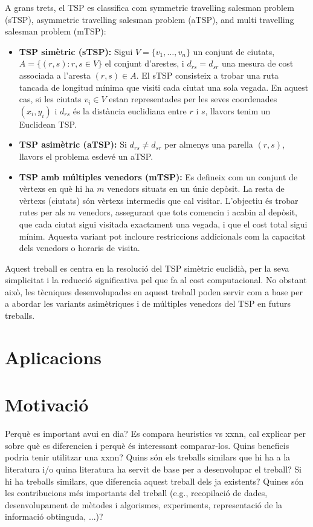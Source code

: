 \documentclass[a4paper,12pt,twoside]{ThesisStyle}
\begin{document}
\medskip

A grans trets, el TSP es classifica com symmetric travelling salesman problem (sTSP), asymmetric travelling salesman problem (aTSP), and multi travelling salesman problem (mTSP):
\begin{itemize}
  \item \textbf{TSP simètric (sTSP):} Sigui \( V = \{ v_1, \dots, v_n \} \) un conjunt de ciutats, \( A = \{ (r,s) : r,s \in V \} \) el conjunt d'arestes, i \( d_{rs} = d_{sr} \) una mesura de cost associada a l'aresta \( (r,s) \in A \). El sTSP consisteix a trobar una ruta tancada de longitud mínima que visiti cada ciutat una sola vegada. En aquest cas, si les ciutats \( v_i \in V \) estan representades per les seves coordenades \( (x_i, y_i) \) i \( d_{rs} \) és la distància euclidiana entre \( r \) i \( s \), llavors tenim un Euclidean TSP.
  \item \textbf{TSP asimètric (aTSP):} Si \( d_{rs} \neq d_{sr} \) per almenys una parella \( (r,s) \), llavors el problema esdevé un aTSP.
  \item \textbf{TSP amb múltiples venedors (mTSP):} Es defineix com un conjunt de vèrtexs en què hi ha \( m \) venedors situats en un únic depòsit. La resta de vèrtexs (ciutats) són vèrtexs intermedis que cal visitar. L'objectiu és trobar rutes per als \( m \) venedors, assegurant que tots comencin i acabin al depòsit, que cada ciutat sigui visitada exactament una vegada, i que el cost total sigui mínim. Aquesta variant pot incloure restriccions addicionals com la capacitat dels venedors o horaris de visita.
\end{itemize}

\medskip

Aquest treball es centra en la resolució del TSP simètric euclidià, per la seva simplicitat i la reducció significativa pel que fa al cost computacional. No obstant això, les tècniques desenvolupades en aquest treball poden servir com a base per a abordar les variants asimètriques i de múltiples venedors del TSP en futurs treballs.


\section{Aplicacions}
\label{Aplicacions}


\section{Motivació}
\label{Motivació}
Perquè es important avui en dia?
Es compara heuristics vs xxnn, cal explicar per sobre què es diferencien i perquè és interessant comparar-los. Quins beneficis podria tenir utilitzar una xxnn?
Quins són els treballs similars que hi ha a la literatura i/o quina literatura ha servit de base per a desenvolupar el treball?
Si hi ha treballs similars, que diferencia aquest treball dels ja existents?
Quines són les contribucions més importants del treball (e.g., recopilació de dades, desenvolupament de mètodes i algorismes, experiments, representació de la informació obtinguda, ...)?
\end{document}
